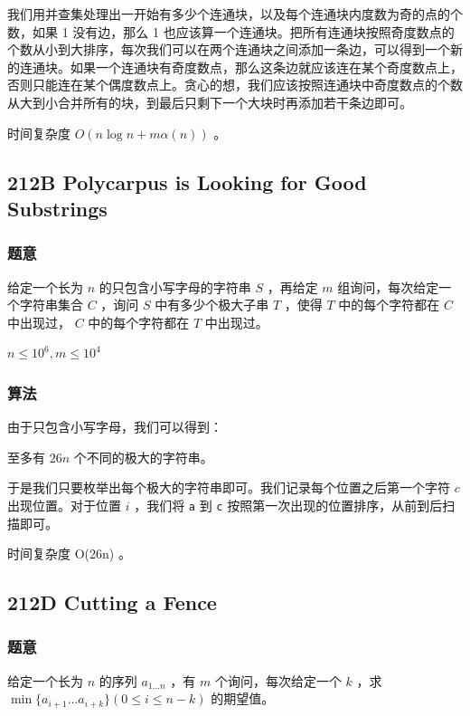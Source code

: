 \documentclass[11pt]{article}
\begin{document}
    我们用并查集处理出一开始有多少个连通块，以及每个连通块内度数为奇的点的个数，如果 1 没有边，那么 1 也应该算一个连通块。把所有连通块按照奇度数点的个数从小到大排序，每次我们可以在两个连通块之间添加一条边，可以得到一个新的连通块。如果一个连通块有奇度数点，那么这条边就应该连在某个奇度数点上，否则只能连在某个偶度数点上。贪心的想，我们应该按照连通块中奇度数点的个数从大到小合并所有的块，到最后只剩下一个大块时再添加若干条边即可。

    时间复杂度 $O(n \log n + m \alpha (n))$ 。
\subsection{212B  Polycarpus is Looking for Good Substrings}
\label{sec-12-4}
\subsubsection{题意}
\label{sec-12-4-1}

给定一个长为 $n$ 的只包含小写字母的字符串 $S$ ，再给定 $m$ 组询问，每次给定一个字符串集合 $C$ ，询问 $S$ 中有多少个极大子串 $T$ ，使得 $T$ 中的每个字符都在 $C$ 中出现过， $C$ 中的每个字符都在 $T$ 中出现过。

$n \leq 10^6, m \leq 10^4$
\subsubsection{算法}
\label{sec-12-4-2}

由于只包含小写字母，我们可以得到：
\begin{theorem}
  至多有 $26n$ 个不同的极大的字符串。
\end{theorem}

于是我们只要枚举出每个极大的字符串即可。我们记录每个位置之后第一个字符 $c$ 出现位置。对于位置 $i$ ，我们将 \texttt{a} 到 \texttt{c} 按照第一次出现的位置排序，从前到后扫描即可。

时间复杂度 O(26n) 。
\subsection{212D  Cutting a Fence}
\label{sec-12-5}
\subsubsection{题意}
\label{sec-12-5-1}

给定一个长为 $n$ 的序列 $a_{1 \dots n}$ ，有 $m$ 个询问，每次给定一个 $k$ ，求 $\min\{a_{i + 1} \dots a_{i + k}\} (0 \leq i \leq n - k)$ 的期望值。
\end{document}
